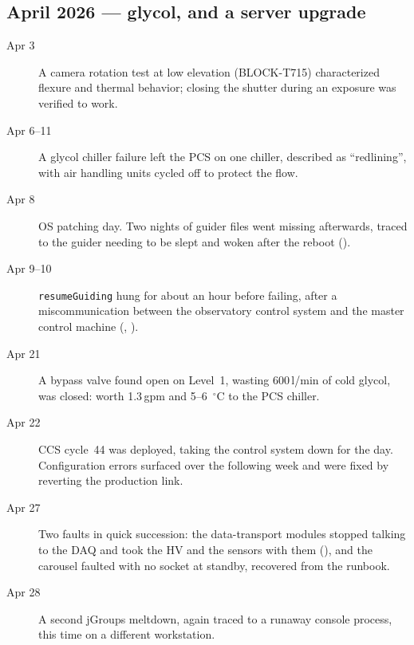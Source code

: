 \subsection{April 2026 --- glycol, and a server upgrade}
\begin{description}

\item[Apr 3] A camera rotation test at low elevation (BLOCK-T715)
  characterized flexure and thermal behavior; closing the shutter
  during an exposure was verified to work.

\item[Apr 6--11] A glycol chiller failure left the PCS on one chiller,
  described as ``redlining'', with air handling units cycled off to
  protect the flow.

\item[Apr 8] OS patching day.  Two nights of guider files went missing
  afterwards, traced to the guider needing to be slept and woken after
  the reboot ().

\item[Apr 9--10] \texttt{resumeGuiding} hung for about an hour before
  failing, after a miscommunication between the observatory control
  system and the master control machine (,
  ).

\item[Apr 21] A bypass valve found open on Level~1, wasting
  600\,l/min of cold glycol, was closed: worth 1.3\,gpm and 5--6\,
  $^{\circ}$C to the PCS chiller.

\item[Apr 22] CCS cycle~44 was deployed, taking the control system
  down for the day.  Configuration errors surfaced over the following
  week and were fixed by reverting the production link.

\item[Apr 27] Two faults in quick succession: the data-transport
  modules stopped talking to the DAQ and took the HV and the sensors
  with them (), and the carousel faulted with no
  socket at standby, recovered from the runbook.

\item[Apr 28] A second jGroups meltdown, again traced to a runaway
  console process, this time on a different workstation.

\end{description}

